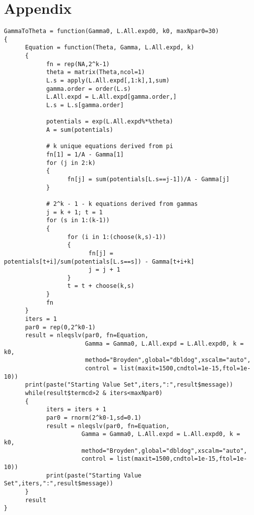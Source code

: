 \documentclass[11 pt, a4paper]{article}  %
\begin{document}
\section*{Appendix}
\begin{verbatim}
GammaToTheta = function(Gamma0, L.All.expd0, k0, maxNpar0=30)
{
      Equation = function(Theta, Gamma, L.All.expd, k)
      {
            fn = rep(NA,2^k-1)
            theta = matrix(Theta,ncol=1)
            L.s = apply(L.All.expd[,1:k],1,sum)
            gamma.order = order(L.s)
            L.All.expd = L.All.expd[gamma.order,]
            L.s = L.s[gamma.order]
            
            potentials = exp(L.All.expd%*%theta)
            A = sum(potentials)
            
            # k unique equations derived from pi
            fn[1] = 1/A - Gamma[1]
            for (j in 2:k)
            {
                  fn[j] = sum(potentials[L.s==j-1])/A - Gamma[j]  
            }
            
            # 2^k - 1 - k equations derived from gammas
            j = k + 1; t = 1
            for (s in 1:(k-1))
            {
                  for (i in 1:(choose(k,s)-1))
                  {
                        fn[j] = potentials[t+i]/sum(potentials[L.s==s]) - Gamma[t+i+k]
                        j = j + 1
                  }
                  t = t + choose(k,s)
            }
            fn
      } 
      iters = 1
      par0 = rep(0,2^k0-1)
      result = nleqslv(par0, fn=Equation, 
                       Gamma = Gamma0, L.All.expd = L.All.expd0, k = k0,
                       method="Broyden",global="dbldog",xscalm="auto", 
                       control = list(maxit=1500,cndtol=1e-15,ftol=1e-10))
      print(paste("Starting Value Set",iters,":",result$message))
      while(result$termcd>2 & iters<maxNpar0)
      {
            iters = iters + 1
            par0 = rnorm(2^k0-1,sd=0.1)
            result = nleqslv(par0, fn=Equation, 
                      Gamma = Gamma0, L.All.expd = L.All.expd0, k = k0,
                      method="Broyden",global="dbldog",xscalm="auto", 
                      control = list(maxit=1500,cndtol=1e-15,ftol=1e-10))
            print(paste("Starting Value Set",iters,":",result$message))
      } 
      result
}
\end{verbatim}
\end{document}
